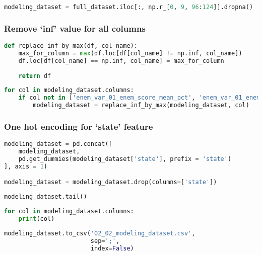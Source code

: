 \begin{lstlisting}[language=Python]
modeling_dataset = full_dataset.iloc[:, np.r_[0, 9, 96:124]].dropna()
\end{lstlisting}

\hypertarget{remove-inf-value-for-all-columns}{%
\subsubsection{Remove `inf' value for all
columns}\label{remove-inf-value-for-all-columns}}

\begin{lstlisting}[language=Python]
def replace_inf_by_max(df, col_name):
    max_for_column = max(df.loc[df[col_name] != np.inf, col_name])
    df.loc[df[col_name] == np.inf, col_name] = max_for_column
    
    return df
\end{lstlisting}

\begin{lstlisting}[language=Python]
for col in modeling_dataset.columns:
    if col not in ['enem_var_01_enem_score_mean_pct', 'enem_var_01_enem_score_std_pct', 'enem_var_01_enem_score_median_pct']:
        modeling_dataset = replace_inf_by_max(modeling_dataset, col)
\end{lstlisting}

\hypertarget{one-hot-encoding-for-state-feature}{%
\subsubsection{One hot encoding for `state'
feature}\label{one-hot-encoding-for-state-feature}}

\begin{lstlisting}[language=Python]
modeling_dataset = pd.concat([
    modeling_dataset,
    pd.get_dummies(modeling_dataset['state'], prefix = 'state')
], axis = 1)

modeling_dataset = modeling_dataset.drop(columns=['state'])
\end{lstlisting}

\begin{lstlisting}[language=Python]
modeling_dataset.tail()
\end{lstlisting}

\begin{lstlisting}[language=Python]
for col in modeling_dataset.columns:
    print(col)
\end{lstlisting}

\begin{lstlisting}[language=Python]
modeling_dataset.to_csv('02_02_modeling_dataset.csv',
                        sep=';',
                        index=False)
\end{lstlisting}

